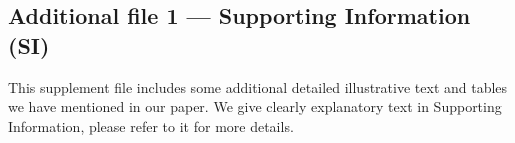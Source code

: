 \documentclass{bmcart}
\begin{document}
\begin{backmatter}
  \subsection*{Additional file 1 --- Supporting Information (SI)}
    This supplement file includes some additional detailed illustrative text and tables we have mentioned in our paper. We give clearly explanatory text in Supporting Information, please refer to it for more details.

\end{backmatter}
\end{document}
